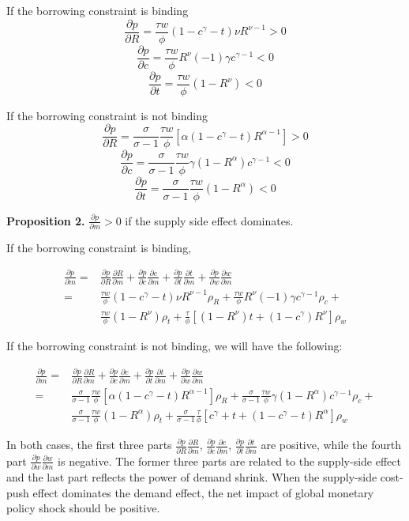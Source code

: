 If the borrowing constraint is binding
$$
\frac{\partial p}{\partial R}=\frac{\tau w}{\phi}(1-c^\gamma-t)\nu R^{\nu-1}>0
$$
$$
\frac{\partial p}{\partial c}=\frac{\tau w}{\phi} R^\nu(-1)\gamma c^{\gamma-1}<0
$$
$$
\frac{\partial p}{\partial t}=\frac{\tau w}{\phi}(1-R^\nu)<0
$$

If the borrowing constraint is not binding
$$
\frac{\partial p}{\partial R}=\frac{\sigma}{\sigma-1}\frac{\tau w}{\phi}[\alpha(1-c^\gamma-t)R^{\alpha-1}]>0
$$
$$
\frac{\partial p}{\partial c}=\frac{\sigma}{\sigma-1}\frac{\tau w}{\phi}\gamma(1-R^\alpha)c^{\gamma-1}<0
$$
$$
\frac{\partial p}{\partial t}=\frac{\sigma}{\sigma-1}\frac{\tau w}{\phi} (1-R^\alpha)<0
$$


\textbf{Proposition 2.} $\frac{\partial p}{\partial m}>0$ if the supply side effect dominates.

If the borrowing constraint is binding,

\begin{align*} 
\frac{\partial p}{\partial m} =&\frac{\partial p}{\partial R}\frac{\partial R}{\partial m}+\frac{\partial p}{\partial c}\frac{\partial c}{\partial m}+\frac{\partial p}{\partial t}\frac{\partial t}{\partial m}+\frac{\partial p}{\partial w}\frac{\partial w}{\partial m}  \\
=& \frac{\tau w}{\phi}(1-c^\gamma-t)\nu R^{\nu-1} \rho_R+ \frac{\tau w}{\phi} R^\nu(-1)\gamma c^{\gamma-1} \rho_c +\\  
& \frac{\tau w}{\phi}(1-R^\nu) \rho_t+\frac{\tau}{\phi}[(1-R^\nu)t+(1-c^\gamma)R^\nu] \rho_w
\end{align*} 

If the borrowing constraint is not binding, we will have the following:

\begin{align*} 
\frac{\partial p}{\partial m} =&\frac{\partial p}{\partial R}\frac{\partial R}{\partial m}+\frac{\partial p}{\partial c}\frac{\partial c}{\partial m}+\frac{\partial p}{\partial t}\frac{\partial t}{\partial m}+\frac{\partial p}{\partial w}\frac{\partial w}{\partial m}  \\
=& \frac{\sigma}{\sigma-1}\frac{\tau w}{\phi}[\alpha(1-c^\gamma-t)R^{\alpha-1}] \rho_R + \frac{\sigma}{\sigma-1}\frac{\tau w}{\phi}\gamma(1-R^\alpha)c^{\gamma-1} \rho_c + \\
& \frac{\sigma}{\sigma-1}\frac{\tau w}{\phi} (1-R^\alpha) \rho_t + \frac{\sigma}{\sigma-1}\frac{\tau}{\phi}[c^\gamma+t+(1-c^\gamma-t)R^\alpha] \rho_w
\end{align*} 

In both cases, the first three parts $\frac{\partial p}{\partial R}\frac{\partial R}{\partial m}$, $\frac{\partial p}{\partial c}\frac{\partial c}{\partial m}$, $\frac{\partial p}{\partial t}\frac{\partial t}{\partial m}$ are positive, while the fourth part $\frac{\partial p}{\partial w}\frac{\partial w}{\partial m} $ is negative. The former three parts are related to the supply-side effect and the last part reflects the power of demand shrink. When the supply-side cost-push effect dominates the demand effect, the net impact of global monetary policy shock should be positive. 

